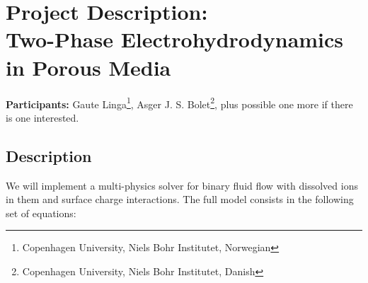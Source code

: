 \documentclass[a4paper,10pt]{article}
\numberwithin{equation}{section}
\numberwithin{figure}{section}
\begin{document}
\section*{Project Description:\\Two-Phase Electrohydrodynamics in Porous Media}
\textbf{Participants:} Gaute Linga\footnote{Copenhagen University, Niels Bohr Institutet, Norwegian}, Asger J. S. Bolet\footnote{Copenhagen University, Niels Bohr Institutet, Danish}, plus possible one more if there is one interested.

\subsection*{Description}
We will implement a multi-physics solver for binary fluid flow with dissolved ions in them and surface charge interactions.
The full model consists in the following set of equations:
\end{document}
